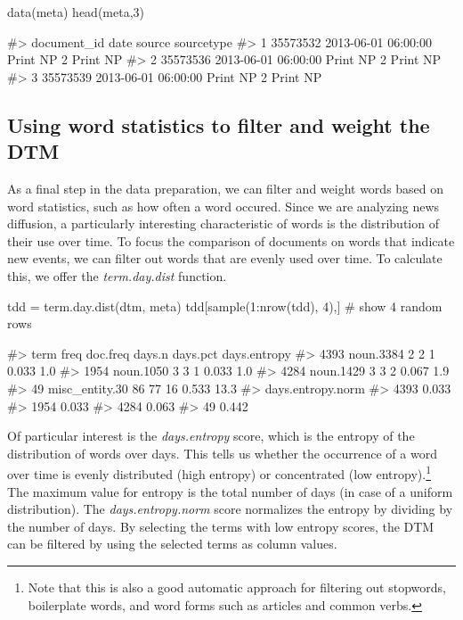 \begin{Schunk}
\begin{Sinput}
data(meta)
head(meta,3)
\end{Sinput}
\begin{Soutput}
#>   document_id                date     source sourcetype
#> 1    35573532 2013-06-01 06:00:00 Print NP 2   Print NP
#> 2    35573536 2013-06-01 06:00:00 Print NP 2   Print NP
#> 3    35573539 2013-06-01 06:00:00 Print NP 2   Print NP
\end{Soutput}
\end{Schunk}

\subsection{Using word statistics to filter and weight the DTM}

As a final step in the data preparation, we can filter and weight words
based on word statistics, such as how often a word occured. Since we are
analyzing news diffusion, a particularly interesting characteristic of
words is the distribution of their use over time. To focus the
comparison of documents on words that indicate new events, we can filter
out words that are evenly used over time. To calculate this, we offer
the \emph{term.day.dist} function.

\begin{Schunk}
\begin{Sinput}
tdd = term.day.dist(dtm, meta)
tdd[sample(1:nrow(tdd), 4),] # show 4 random rows
\end{Sinput}
\begin{Soutput}
#>                term freq doc.freq days.n days.pct days.entropy
#> 4393      noun.3384    2        2      1    0.033          1.0
#> 1954      noun.1050    3        3      1    0.033          1.0
#> 4284      noun.1429    3        3      2    0.067          1.9
#> 49   misc_entity.30   86       77     16    0.533         13.3
#>      days.entropy.norm
#> 4393             0.033
#> 1954             0.033
#> 4284             0.063
#> 49               0.442
\end{Soutput}
\end{Schunk}

Of particular interest is the \emph{days.entropy} score, which is the
entropy of the distribution of words over days. This tells us whether
the occurrence of a word over time is evenly distributed (high entropy)
or concentrated (low entropy).\footnote{Note that this is also a good
  automatic approach for filtering out stopwords, boilerplate words, and
  word forms such as articles and common verbs.} The maximum value for
entropy is the total number of days (in case of a uniform distribution).
The \emph{days.entropy.norm} score normalizes the entropy by dividing by
the number of days. By selecting the terms with low entropy scores, the
DTM can be filtered by using the selected terms as column values.

